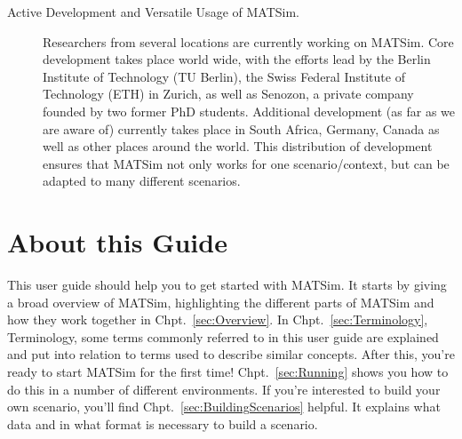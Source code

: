 \begin{description}
\item[Active Development and Versatile Usage of MATSim.]
Researchers from several locations are currently working on MATSim. Core
development takes place world wide, with the efforts lead by the Berlin
Institute of Technology (TU Berlin), the Swiss Federal Institute of Technology
(ETH) in Zurich, as well as Senozon, a private company founded by two former PhD students.
Additional development (as far as we are aware of) currently takes place in
South Africa, Germany, Canada as well as other places around the world. This
distribution of development ensures that MATSim not only works for one
scenario/context, but can be adapted to many different scenarios.
\end{description}

\section{About this Guide}

This user guide should help you to get started with MATSim. 
It starts by giving a broad overview of MATSim, highlighting the different parts
of MATSim and how they work together in Chpt.~\ref{sec:Overview}. In
Chpt.~\ref{sec:Terminology}, Terminology, some terms commonly referred to in
this user guide are explained and put into relation to terms used to
describe similar concepts. After this, you're ready to start MATSim for the
first time! Chpt.~\ref{sec:Running} shows you how to do this in a number of
different environments. If you're interested to build your own scenario, you'll
find Chpt.~\ref{sec:BuildingScenarios} helpful. It explains what data and in
what format is necessary to build a scenario.


